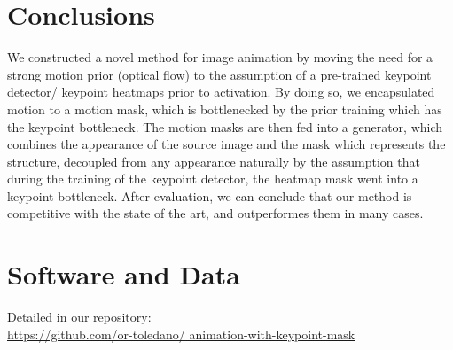 \documentclass{article}
\begin{document}
\section{Conclusions}
We constructed a novel method for image animation by moving the need for
a strong motion prior (optical flow) to the assumption of a pre-trained
keypoint detector/ keypoint heatmaps prior to activation.
By doing so, we encapsulated motion to a motion mask, which is
bottlenecked by the prior training which has the keypoint bottleneck.
The motion masks are then fed into a generator, which combines the
appearance of the source image and the mask which represents the structure,
decoupled from any appearance naturally by the assumption that during the
training of the keypoint detector, the heatmap mask went into a keypoint
bottleneck. After evaluation, we can conclude that our method is
competitive with the state of the art, and outperformes them in many cases.
\section*{Software and Data}
Detailed in our repository:
\\
\url{https://github.com/or-toledano/
animation-with-keypoint-mask}


\end{document}
